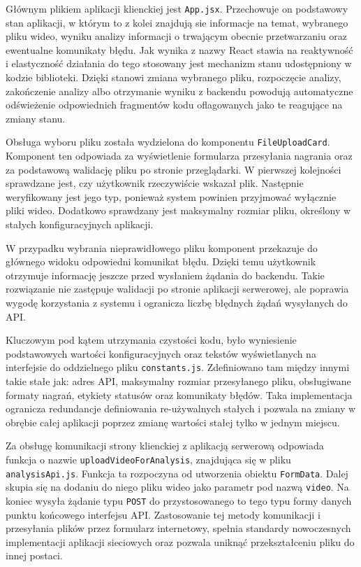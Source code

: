 Głównym plikiem aplikacji klienckiej jest \texttt{App.jsx}. Przechowuje on podstawowy stan aplikacji, w którym to z kolei znajdują sie informacje na temat, wybranego pliku wideo, wyniku analizy informacji o trwającym obecnie przetwarzaniu oraz ewentualne komunikaty błędu. Jak wynika z nazwy React stawia na reaktywność i elastyczność działania do tego stosowany jest mechanizm stanu udostępniony w kodzie biblioteki. Dzięki stanowi zmiana wybranego pliku, rozpoczęcie analizy, zakończenie analizy albo otrzymanie wyniku z backendu powodują automatyczne odświeżenie odpowiednich fragmentów kodu oflagowanych jako te reagujące na zmiany stanu.

Obsługa wyboru pliku została wydzielona do komponentu \texttt{FileUploadCard}. Komponent ten odpowiada za wyświetlenie formularza przesyłania nagrania oraz za podstawową walidację pliku po stronie przeglądarki. W pierwszej kolejności sprawdzane jest, czy użytkownik rzeczywiście wskazał plik. Następnie weryfikowany jest jego typ, ponieważ system powinien przyjmować wyłącznie pliki wideo. Dodatkowo sprawdzany jest maksymalny rozmiar pliku, określony w stałych konfiguracyjnych aplikacji.

W przypadku wybrania nieprawidłowego pliku komponent przekazuje do głównego widoku odpowiedni komunikat błędu. Dzięki temu użytkownik otrzymuje informację jeszcze przed wysłaniem żądania do backendu. Takie rozwiązanie nie zastępuje walidacji po stronie aplikacji serwerowej, ale poprawia wygodę korzystania z systemu i ogranicza liczbę błędnych żądań wysyłanych do API.

Kluczowym pod kątem utrzymania czystości kodu, było wyniesienie podstawowych wartości konfiguracyjnych oraz tekstów wyświetlanych na interfejsie do oddzielnego pliku \texttt{constants.js}. Zdefiniowano tam między innymi takie stałe jak: adres API, maksymalny rozmiar przesyłanego pliku, obsługiwane formaty nagrań, etykiety statusów oraz komunikaty błędów. Taka implementacja ogranicza redundancje definiowania re-używalnych stałych i pozwala na zmiany w obrębie całej aplikacji poprzez zmianę wartości stałej tylko w jednym miejscu.

Za obsługę komunikacji strony klienckiej z aplikacją serwerową odpowiada funkcja o nazwie \texttt{uploadVideoForAnalysis}, znajdująca się w pliku \texttt{analysisApi.js}. Funkcja ta rozpoczyna od utworzenia obiektu \texttt{FormData}. Dalej skupia się na dodaniu do niego pliku wideo jako parametr pod nazwą \texttt{video}. Na koniec wysyła żądanie typu \texttt{POST} do przystosowanego to tego typu formy danych punktu końcowego interfejsu API. Zastosowanie tej metody komunikacji i przesyłania plików przez formularz internetowy, spełnia standardy nowoczesnych implementacji aplikacji sieciowych  oraz pozwala uniknąć przekształceniu pliku do innej postaci. 

